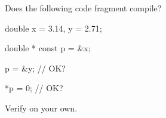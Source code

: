 Does the following code fragment compile?



\begin{consolethree}[escapeinside=||]

double x = 3.14, y = 2.71;

double * const p = &x;

p = &y; // OK?

*p = 0; // OK?

\end{consolethree}

Verify on your own.

